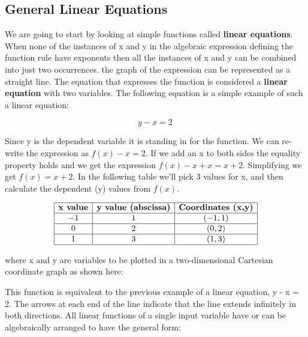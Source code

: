 \subsection{General Linear Equations}
\label{sss:gene-4191}




We are going to start by looking at simple functions called \textbf{linear equations}.
When none of the instances of x and y in the algebraic expression defining the function
rule have exponents then all the instances of x and y can be combined into just two
occurrences. the graph of the expression can be represented as a straight line. The
equation that expresses the function is considered a \textbf{linear equation} with two
variables. The following equation is a simple example of such a linear equation:



$$y - x = 2 \,$$



Since y is the dependent variable it is standing in for the function. We can re-write the
expression as $f(x) - x = 2$. If we add an x to both sides the equality property holds and
we get the expression $f(x) - x + x = x + 2$. Simplifying we get $f(x) = x + 2$. In the
following table we'll pick 3 values for x, and then calculate the dependent (y) values
from $f(x)$.



$$\begin{array}{|c|c|c|}
\hline
\textbf{x value} & \textbf{y value (abscissa)} & \textbf{Coordinates (x,y)} \\ 
\hline
-1 & 1 & (-1,1) \\ 
\hline
0 & 2 & (0,2) \\ 
\hline
1 & 3 & (1,3) \\ 
\hline 
\end{array}$$



where x and y are variables to be plotted in a two-dimensional Cartesian coordinate graph
as shown here:









This function is equivalent to the previous example of a linear equation, y - x = 2. The
arrows at each end of the line indicate that the line extends infinitely in both
directions. All linear functions of a single input variable have or can be algebraically
arranged to have the general form:



